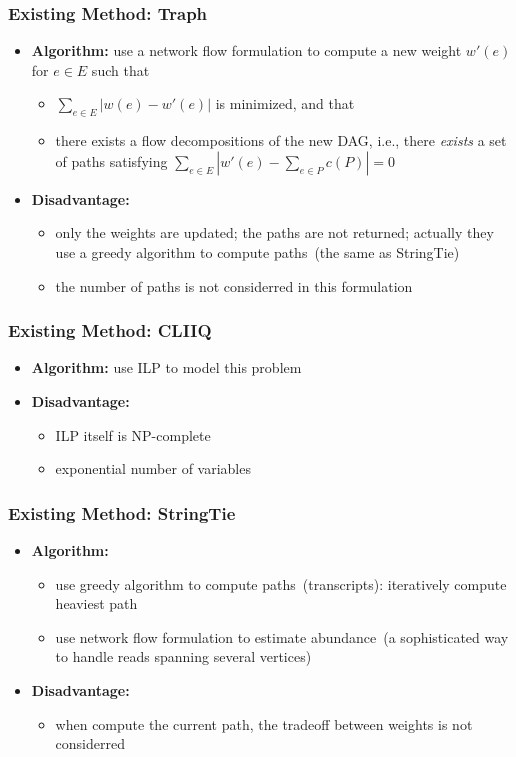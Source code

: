 \frame
{
	\frametitle{Existing Method: Traph}
	\begin{itemize}
	\item {\bf Algorithm:} use a network flow formulation to compute a new
		weight $w'(e)$ for $e\in E$ such that
		\begin{itemize}
		\item $\sum_{e\in E} |w(e) - w'(e)|$ is minimized, and that 
		\item there exists a flow decompositions of the new DAG, i.e.,
		there \emph{exists} a set of paths satisfying $\sum_{e\in E} | w'(e) - \sum_{e\in P} c(P)| = 0$
		\end{itemize}
	\vspace{0.4cm}
	\item {\bf Disadvantage:} 
		\begin{itemize}
		\item only the weights are updated; the paths are not returned; actually
			they use a greedy algorithm to compute paths~(the same as StringTie)
		\vspace{0.2cm}
		\item the number of paths is not considerred in this formulation
		\end{itemize}
	\end{itemize}
}

\frame
{
	\frametitle{Existing Method: CLIIQ}
	\begin{itemize}
	\item {\bf Algorithm:} use ILP to model this problem
	\vspace{0.5cm}
	\item {\bf Disadvantage:} 
		\begin{itemize} 
		\item ILP itself is NP-complete
		\item exponential number of variables
		\end{itemize}
	\end{itemize}
}

\frame
{
	\frametitle{Existing Method: StringTie}
	\begin{itemize}
	\item {\bf Algorithm:} 
		\begin{itemize}
		\item use greedy algorithm to compute paths~(transcripts): iteratively
			compute heaviest path
		\item use network flow formulation to estimate abundance~(a sophisticated
				way to handle reads spanning several vertices)
		\end{itemize}
	\vspace{0.5cm}
	\item {\bf Disadvantage:} 
		\begin{itemize} 
		\item when compute the current path, the tradeoff between weights is
			not considerred
		\end{itemize}
	\end{itemize}
}

